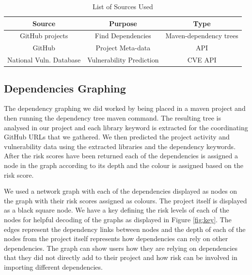 \documentclass[conference]{IEEEtran}
\begin{document}
\begin{table}[H]
 \caption{List of Sources Used}
\label{sourcelist}
\begin{center}
\begin{tabular}{|c|c|c|}
\hline
    \textbf{Source} & \textbf{Purpose} & \textbf{Type} \\ \hline
    GitHub projects & Find Dependencies & Maven-dependency trees \\ \hline
    GitHub & Project Meta-data & API  \\ \hline
    National Vuln. Database & Vulnerability Prediction & CVE API \\ \hline
\end{tabular}
\end{center}
\end{table}

\subsection{Dependencies Graphing}
The dependency graphing we did worked by being placed in a maven project and then running the dependency tree maven command. The resulting tree is analysed in our project and each library keyword is extracted for the coordinating GitHub URLs that we gathered. We then predicted the project activity and vulnerability data using the extracted libraries and the dependency keywords. After the risk scores have been returned each of the dependencies is assigned a node in the graph according to its depth and the colour is assigned based on the risk score.

We used a network graph with each of the dependencies displayed as nodes on the graph with their risk scores assigned as colours. The project itself is displayed as a black square node. We have a key defining the risk levels of each of the nodes for helpful decoding of the graphs as displayed in Figure \ref{fig:key}. The edges represent the dependency links between nodes and the depth of each of the nodes from the project itself represents how dependencies can rely on other dependencies. The graph can show users how they are relying on dependencies that they did not directly add to their project and how risk can be involved in importing different dependencies. 
\end{document}
